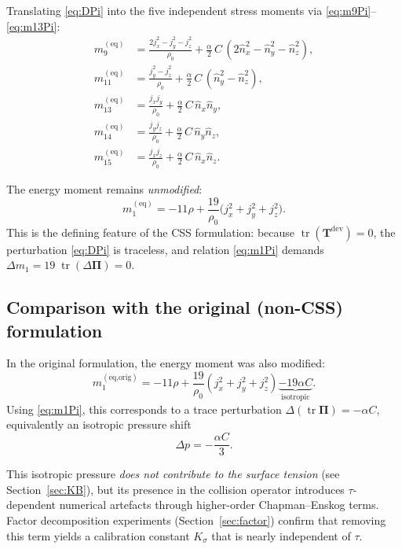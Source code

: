 \documentclass[11pt,a4paper]{article}
\newcommand{\tens}[1]{\bm{#1}}
\newcommand{\tr}{\operatorname{tr}}
\begin{document}
Translating \eqref{eq:DPi} into the five independent stress moments
via \eqref{eq:m9Pi}--\eqref{eq:m13Pi}:
\begin{align}
  m_9^{(\text{eq})}  &= \frac{2j_x^2 - j_y^2 - j_z^2}{\rho_0}
    + \frac{\alpha}{2}\,C\,(2\hat{n}_x^2 - \hat{n}_y^2 - \hat{n}_z^2),
  \label{eq:m9css}\\[4pt]
  m_{11}^{(\text{eq})} &= \frac{j_y^2 - j_z^2}{\rho_0}
    + \frac{\alpha}{2}\,C\,(\hat{n}_y^2 - \hat{n}_z^2),
  \label{eq:m11css}\\[4pt]
  m_{13}^{(\text{eq})} &= \frac{j_x j_y}{\rho_0}
    + \frac{\alpha}{2}\,C\,\hat{n}_x\hat{n}_y,\\[4pt]
  m_{14}^{(\text{eq})} &= \frac{j_y j_z}{\rho_0}
    + \frac{\alpha}{2}\,C\,\hat{n}_y\hat{n}_z,\\[4pt]
  m_{15}^{(\text{eq})} &= \frac{j_x j_z}{\rho_0}
    + \frac{\alpha}{2}\,C\,\hat{n}_x\hat{n}_z.
  \label{eq:m15css}
\end{align}

The energy moment remains \emph{unmodified}:
\begin{equation}
  m_1^{(\text{eq})} = -11\rho + \frac{19}{\rho_0}\bigl(j_x^2+j_y^2+j_z^2\bigr).
  \label{eq:m1css}
\end{equation}
This is the defining feature of the CSS formulation: because
$\tr(\tens{T}^{\text{dev}})=0$, the perturbation
\eqref{eq:DPi} is traceless, and relation \eqref{eq:m1Pi} demands
$\Delta m_1 = 19\;\tr(\Delta\tens{\Pi}) = 0$.

\subsection{Comparison with the original (non-CSS) formulation}

In the original formulation, the energy moment was also modified:
\begin{equation}
  m_1^{(\text{eq,orig})} = -11\rho + \frac{19}{\rho_0}
  (j_x^2+j_y^2+j_z^2)
  \underbrace{- 19\alpha C}_{\text{isotropic}}.
  \label{eq:m1orig}
\end{equation}
Using \eqref{eq:m1Pi}, this corresponds to a trace perturbation
$\Delta(\tr\tens{\Pi}) = -\alpha C$, equivalently an isotropic pressure
shift
\begin{equation}
  \Delta p = -\frac{\alpha C}{3}.
  \label{eq:Dpiso}
\end{equation}

This isotropic pressure \emph{does not contribute to the surface tension}
(see Section~\ref{sec:KB}), but its presence in the collision operator
introduces $\tau$\nobreakdash-dependent numerical artefacts through
higher-order Chapman--Enskog terms.  Factor decomposition experiments
(Section~\ref{sec:factor}) confirm that removing this term yields a
calibration constant $K_\sigma$ that is nearly independent of $\tau$.
\end{document}
